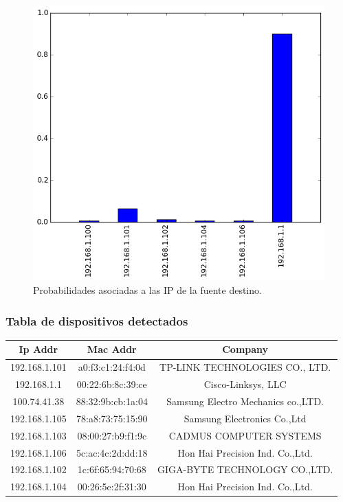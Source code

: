 \begin{figure}[h!]
  \centering
	\includegraphics[scale=0.66]{../experimentacion-svilerino/casa/histogram_dst_probabilities.png}
  \caption{Probabilidades asociadas a las IP de la fuente destino.}
\end{figure}

\subsubsection{Tabla de dispositivos detectados}
\begin{tabular}{ |c|c|c| }
	\hline
	Ip Addr & Mac Addr & Company \\	
	\hline
	192.168.1.101 & a0:f3:c1:24:f4:0d & TP-LINK TECHNOLOGIES CO., LTD. \\
	\hline
	192.168.1.1 & 00:22:6b:8c:39:ce & Cisco-Linksys, LLC \\
	\hline
	100.74.41.38 & 88:32:9b:cb:1a:04 & Samsung Electro Mechanics co.,LTD. \\
	\hline
	192.168.1.105 & 78:a8:73:75:15:90 & Samsung Electronics Co.,Ltd \\
	\hline
	192.168.1.103 & 08:00:27:b9:f1:9c & CADMUS COMPUTER SYSTEMS \\
	\hline
	192.168.1.106 & 5c:ac:4c:2d:dd:18 & Hon Hai Precision Ind. Co.,Ltd. \\
	\hline
	192.168.1.102 & 1c:6f:65:94:70:68 & GIGA-BYTE TECHNOLOGY CO.,LTD. \\
	\hline
	192.168.1.104 & 00:26:5e:2f:31:30 & Hon Hai Precision Ind. Co.,Ltd. \\
	\hline
\end{tabular}

